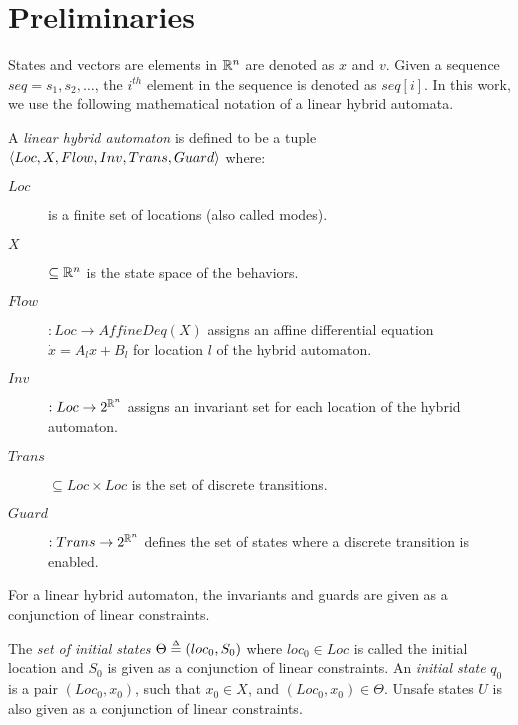 \section{Preliminaries}
\label{sec:prelims}

States and vectors are elements in $\reals^n$ are denoted as $x$ and $v$. Given a sequence $seq = s_1, s_2, \ldots$, the $i^{th}$
element in the sequence is denoted as $seq[i]$. In this work, we use the following mathematical notation of a linear hybrid automata.

\begin{definition}
\label{def:hybridAutomata}
 A \emph{linear hybrid automaton} is defined to be a tuple \newline
 $\tup{Loc, X, Flow, Inv, Trans, Guard}$ where:
 \vspace{-0.2cm}
\begin{description}
\item[$Loc$] is a finite set of locations (also called modes).
\item[$X$] $\subseteq \reals^n$ is the state space of the behaviors.
\item[$Flow$] $: Loc \rightarrow \textit{AffineDeq}(X)$ assigns an affine differential equation $\dot{x} = A_l x + B_l$ for location $l$ of the hybrid automaton.
\item[$Inv$] $: Loc \rightarrow 2^{\reals^n}$ assigns an invariant set for each location of the hybrid automaton.
\item[$Trans$] $\subseteq Loc \times Loc$ is the set of discrete transitions.
\item[$Guard$] $: Trans \rightarrow 2^{\reals^n}$ defines the set of states where a discrete transition is enabled.
\end{description}
\vspace{-0.2cm}
For a linear hybrid automaton, the invariants and guards are given as a conjunction of linear constraints.
\end{definition}

The \textit{set of initial states} $\Theta \mathrel{\stackrel{\scriptscriptstyle\Delta}{=}} (loc_0, S_0)$ where $loc_0 \in Loc$ is called the initial location and $S_0$ is given as a conjunction of linear constraints.
%
An \textit{initial state} $q_0$ is a pair $(Loc_0, x_0)$, such that $x_0 \in X$, and $(Loc_0, x_0) \in \Theta$.
%
Unsafe states $U$ is also given as a conjunction of linear constraints. 

